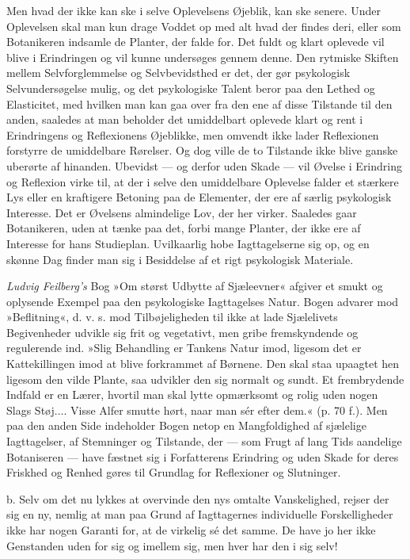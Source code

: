 \documentclass[12pt,a4paper,openany]{book}
\newcommand{\opage}[1]{\marginnote{\footnotesize\textit{[#1]}}}
\begin{document}
Men hvad der ikke kan ske i selve Oplevelsens Øjeblik, kan ske senere.
Under Oplevelsen skal man kun drage Voddet op med alt hvad der findes
deri, eller som Botanikeren indsamle de Planter, der falde for. Det
fuldt og klart oplevede vil blive i Erindringen og vil kunne undersøges
gennem denne. Den rytmiske Skiften mellem Selvforglemmelse og
Selvbevidsthed er det, der gør psykologisk Selvundersøgelse mulig, og
det psykologiske Talent beror paa den Lethed og Elasticitet, med hvilken
man kan gaa over fra den ene af disse Tilstande til den anden, saaledes
at man beholder det umiddelbart oplevede klart og rent i Erindringens og
Reflexionens Øjeblikke, men omvendt ikke lader Reflexionen forstyrre de
umiddelbare Rørelser. Og dog ville de to Tilstande ikke blive ganske
uberørte af hinanden. Ubevidst --- og derfor uden Skade --- vil Øvelse i
Erindring og Reflexion virke til, at der i selve den umiddelbare
Oplevelse falder et stærkere Lys eller en kraftigere Betoning paa de
Elementer, der ere af særlig psykologisk Interesse. Det er Øvelsens
almindelige Lov, der her virker. Saaledes gaar Botanikeren, uden at
tænke paa det, forbi mange Planter, der ikke ere af Interesse for hans
Studieplan. Uvilkaarlig hobe Iagttagelserne sig op, og en skønne Dag
finder man sig i Besiddelse af et rigt psykologisk Materiale.

\emph{Ludvig Feilberg’s} Bog »Om størst Udbytte af Sjæleevner« afgiver
et smukt og oplysende Exempel paa den psykologiske Iagttagelses Natur.
Bogen advarer mod »Beflitning«, d. v. s. mod Tilbøjeligheden til ikke at
lade Sjælelivets Begivenheder udvikle sig frit og vegetativt, men gribe
fremskyndende
\opage{21}og regulerende ind. »Slig Behandling er Tankens Natur imod,
ligesom det er Kattekillingen imod at blive forkrammet af Børnene. Den
skal staa upaagtet hen ligesom den vilde Plante, saa udvikler den sig
normalt og sundt. Et frembrydende Indfald er en Lærer, hvortil man skal
lytte opmærksomt og rolig uden nogen Slags Støj.... Visse Alfer smutte
hørt, naar man sér efter dem.« (p. 70 f.). Men paa den anden Side
indeholder Bogen netop en Mangfoldighed af sjælelige Iagttagelser, af
Stemninger og Tilstande, der --- som Frugt af lang Tids aandelige
Botaniseren --- have fæstnet sig i Forfatterens Erindring og uden Skade
for deres Friskhed og Renhed gøres til Grundlag for Reflexioner og
Slutninger.

b. Selv om det nu lykkes at overvinde den nys omtalte Vanskelighed,
rejser der sig en ny, nemlig at man paa Grund af Iagttagernes
individuelle Forskelligheder ikke har nogen Garanti for, at de virkelig
sé det samme. De have jo her ikke Genstanden uden for sig og imellem
sig, men hver har den i sig selv!
\end{document}
